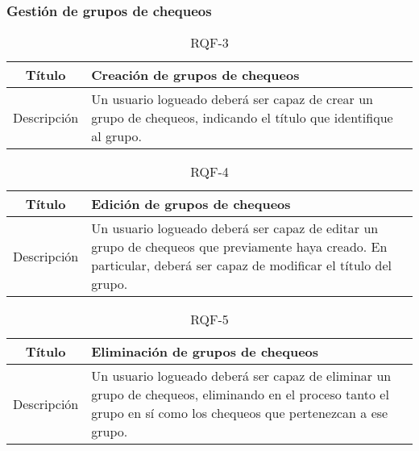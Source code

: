 \FloatBarrier
\subsubsection{Gestión de grupos de chequeos}

\begin{table}[h!]
  \centering
  \begin{tabularx}{\textwidth}{|c|X|}
    \hline
    Título & Creación de grupos de chequeos \\

    \hline

    Descripción & Un usuario logueado deberá ser capaz de crear un grupo de
    chequeos, indicando el título que identifique al grupo.\\

    \hline
  \end{tabularx}
  \caption{RQF-3}
\end{table}

\begin{table}[h!]
  \centering
  \begin{tabularx}{\textwidth}{|c|X|}
    \hline
    Título & Edición de grupos de chequeos \\

    \hline

    Descripción & Un usuario logueado deberá ser capaz de editar un grupo de
    chequeos que previamente haya creado. En particular, deberá ser capaz de
    modificar el título del grupo.

    \\

    \hline
  \end{tabularx}
  \caption{RQF-4}
\end{table}

\begin{table}[h!]
  \centering
  \begin{tabularx}{\textwidth}{|c|X|}
    \hline
    Título & Eliminación de grupos de chequeos \\

    \hline

    Descripción & Un usuario logueado deberá ser capaz de eliminar un grupo de
    chequeos, eliminando en el proceso tanto el grupo en sí como los chequeos
    que pertenezcan a ese grupo. \\

    \hline
  \end{tabularx}
  \caption{RQF-5}
\end{table}

